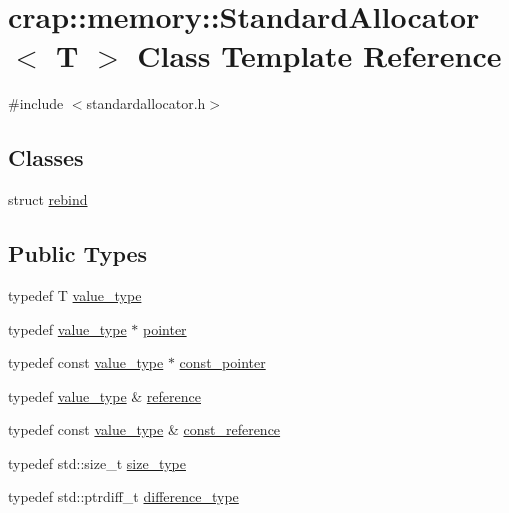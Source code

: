 \hypertarget{classcrap_1_1memory_1_1_standard_allocator}{\section{crap\-:\-:memory\-:\-:Standard\-Allocator$<$ T $>$ Class Template Reference}
\label{classcrap_1_1memory_1_1_standard_allocator}
}


{\ttfamily \#include $<$standardallocator.\-h$>$}

\subsection*{Classes}
\begin{DoxyCompactItemize}
\item 
struct \hyperlink{structcrap_1_1memory_1_1_standard_allocator_1_1rebind}{rebind}
\end{DoxyCompactItemize}
\subsection*{Public Types}
\begin{DoxyCompactItemize}
\item 
typedef T \hyperlink{classcrap_1_1memory_1_1_standard_allocator_a2b377d4555fd42cd31d050856a8d389c}{value\-\_\-type}
\item 
typedef \hyperlink{classcrap_1_1memory_1_1_standard_allocator_a2b377d4555fd42cd31d050856a8d389c}{value\-\_\-type} $\ast$ \hyperlink{classcrap_1_1memory_1_1_standard_allocator_a92221f3975cb89b59eaa308e8a470c6d}{pointer}
\item 
typedef const \hyperlink{classcrap_1_1memory_1_1_standard_allocator_a2b377d4555fd42cd31d050856a8d389c}{value\-\_\-type} $\ast$ \hyperlink{classcrap_1_1memory_1_1_standard_allocator_aa04b0d1d61d571ec3e7845038fd39144}{const\-\_\-pointer}
\item 
typedef \hyperlink{classcrap_1_1memory_1_1_standard_allocator_a2b377d4555fd42cd31d050856a8d389c}{value\-\_\-type} \& \hyperlink{classcrap_1_1memory_1_1_standard_allocator_ad4f01aad766fa81a29635512e8096f47}{reference}
\item 
typedef const \hyperlink{classcrap_1_1memory_1_1_standard_allocator_a2b377d4555fd42cd31d050856a8d389c}{value\-\_\-type} \& \hyperlink{classcrap_1_1memory_1_1_standard_allocator_a465f96f36f9ae046e9af1a0b15d9ae91}{const\-\_\-reference}
\item 
typedef std\-::size\-\_\-t \hyperlink{classcrap_1_1memory_1_1_standard_allocator_a647535d0ddf782ac9cf2d77c6a63aa59}{size\-\_\-type}
\item 
typedef std\-::ptrdiff\-\_\-t \hyperlink{classcrap_1_1memory_1_1_standard_allocator_a4af311d64dd0118965f23b6e1d0e185e}{difference\-\_\-type}
\end{DoxyCompactItemize}
